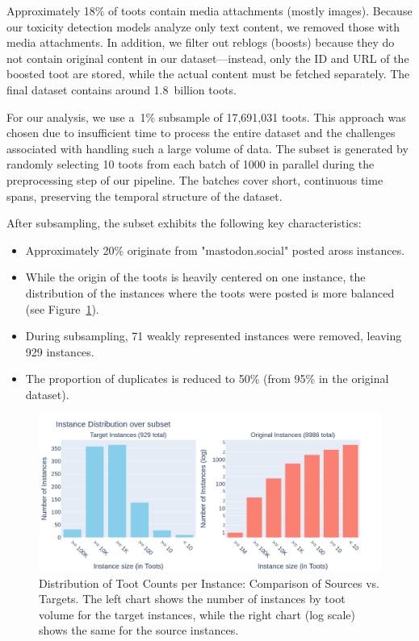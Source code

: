 Approximately 18\% of toots contain media attachments (mostly images). Because our toxicity detection models analyze only text content, we removed those with media attachments. In addition, we filter out reblogs (boosts) because they do not contain original content in our dataset---instead, only the ID and URL of the boosted toot are stored, while the actual content must be fetched separately. The final dataset contains around 1.8~billion toots.

For our analysis, we use a~1\% subsample of 17,691,031 toots. This approach was chosen due to insufficient time to process the entire dataset and the challenges associated with handling such a large volume of data. The subset is generated by randomly selecting 10 toots from each batch of 1000 in parallel during the preprocessing step of our pipeline. The batches cover short, continuous time spans, preserving the temporal structure of the dataset. 

\newpage
After subsampling, the subset exhibits the following key characteristics:

\begin{itemize}
\item Approximately 20\% originate from "mastodon.social" posted aross instances.
\item While the origin of the toots is heavily centered on one instance, the distribution of the instances where the toots were posted is more balanced (see Figure~\ref{instance-distribution}).
\item During subsampling, 71 weakly represented instances were removed, leaving 929 instances.
\item The proportion of duplicates is reduced to 50\% (from 95\% in the original dataset).
\end{itemize}

\begin{figure}[tb]
    \centering
    \includegraphics[width=\textwidth]{../material/instance_distribution.png}
    \caption{Distribution of Toot Counts per Instance: Comparison of Sources vs. Targets. The left chart shows the number of instances by toot volume for the target instances, while the right chart (log scale) shows the same for the source instances.}
    \label{instance-distribution}
\end{figure}

